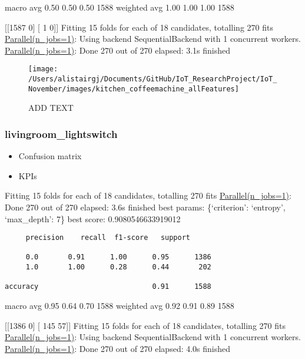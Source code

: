 \documentclass[11pt,]{article}
\providecommand{\tightlist}{%
  \setlength{\itemsep}{0pt}\setlength{\parskip}{0pt}}
\begin{document}
macro avg 0.50 0.50 0.50 1588 weighted avg 1.00 1.00 1.00 1588

{[}{[}1587 0{]} {[} 1 0{]}{]} Fitting 15 folds for each of 18
candidates, totalling 270 fits
\href{Done\%20270\%20out\%20of\%20270\%20\%7C\%20elapsed:\%202.1s\%20finished}{Parallel(n\_jobs=1)}:
Using backend SequentialBackend with 1 concurrent workers.
\href{Done\%20270\%20out\%20of\%20270\%20\%7C\%20elapsed:\%202.1s\%20finished}{Parallel(n\_jobs=1)}:
Done 270 out of 270 \textbar{} elapsed: 3.1s finished

\begin{figure}[H]

{\centering \texttt{[image: /Users/alistairgj/Documents/GitHub/IoT\_ResearchProject/IoT\_November/images/kitchen\_coffeemachine\_allFeatures]} 

}

\caption{ADD TEXT}\label{fig:unnamed-chunk-17}
\end{figure}

\pagebreak

\hypertarget{livingroom_lightswitch}{%
\subsubsection{livingroom\_lightswitch}\label{livingroom_lightswitch}}

\begin{itemize}
\tightlist
\item
  Confusion matrix
\item
  KPIs
\end{itemize}

Fitting 15 folds for each of 18 candidates, totalling 270 fits
\href{Done\%20270\%20out\%20of\%20270\%20\%7C\%20elapsed:\%202.1s\%20finished}{Parallel(n\_jobs=1)}:
Done 270 out of 270 \textbar{} elapsed: 3.6s finished best params:
\{`criterion': `entropy', `max\_depth': 7\} best score:
0.9080546633919012

\begin{verbatim}
     precision    recall  f1-score   support

     0.0       0.91      1.00      0.95      1386
     1.0       1.00      0.28      0.44       202

accuracy                           0.91      1588
\end{verbatim}

macro avg 0.95 0.64 0.70 1588 weighted avg 0.92 0.91 0.89 1588

{[}{[}1386 0{]} {[} 145 57{]}{]} Fitting 15 folds for each of 18
candidates, totalling 270 fits
\href{Done\%20270\%20out\%20of\%20270\%20\%7C\%20elapsed:\%202.1s\%20finished}{Parallel(n\_jobs=1)}:
Using backend SequentialBackend with 1 concurrent workers.
\href{Done\%20270\%20out\%20of\%20270\%20\%7C\%20elapsed:\%202.1s\%20finished}{Parallel(n\_jobs=1)}:
Done 270 out of 270 \textbar{} elapsed: 4.0s finished
\end{document}
